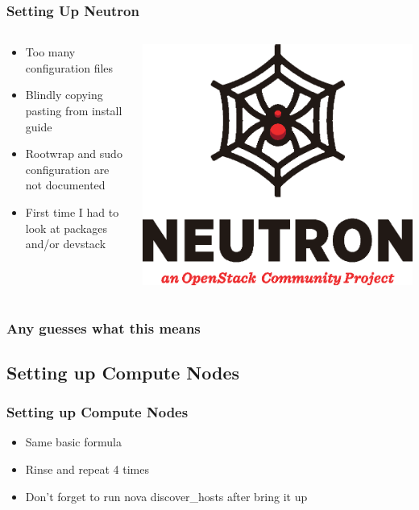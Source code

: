 \documentclass[aspectratio=169,11pt,hyperref={colorlinks=true}]{beamer}
\begin{document}
\begin{frame}
    \frametitle{Setting Up Neutron}
    \begin{columns}[T]
        \begin{column}{.48\textwidth}
            \begin{itemize}
                \item Too many configuration files
                \item Blindly copying pasting from install guide
                \item Rootwrap and sudo configuration are not documented
                \item First time I had to look at packages and/or devstack
            \end{itemize}
        \end{column}
        \begin{column}{.48\textwidth}
            \includegraphics[width=\textwidth]{mascots/neutron.eps}
        \end{column}
    \end{columns}
\end{frame}

\begin{frame}
    \frametitle{Any guesses what this means}
    
\end{frame}

\subsection{Setting up Compute Nodes}
\begin{frame}
    \frametitle{Setting up Compute Nodes}
    \begin{itemize}
        \item Same basic formula
        \item Rinse and repeat 4 times
        \item Don't forget to run nova discover\_hosts after bring it up
    \end{itemize}
\end{frame}
\end{document}
